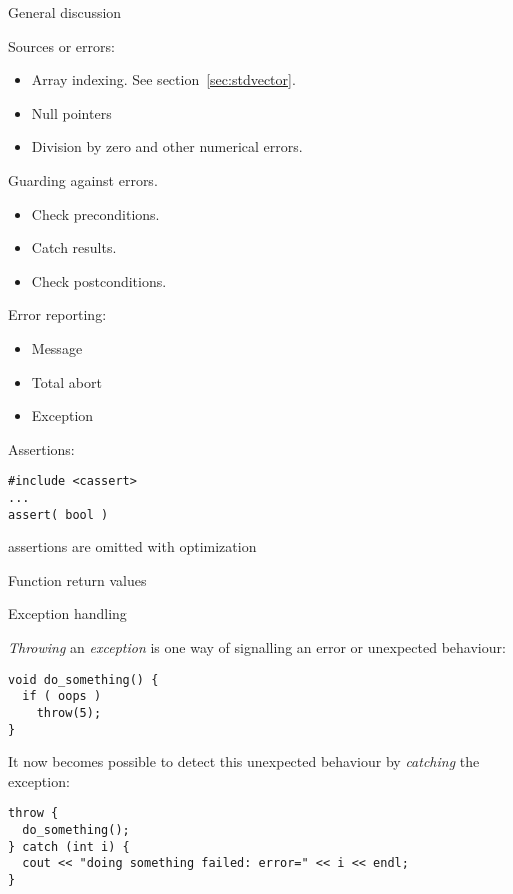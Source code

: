 
 {General discussion}

Sources or errors:
\begin{itemize}
\item Array indexing. See section~\ref{sec:stdvector}.
\item Null pointers
\item Division by zero and other numerical errors.
\end{itemize}

Guarding against errors.
\begin{itemize}
\item Check preconditions.
\item Catch results.
\item Check postconditions.
\end{itemize}

Error reporting:
\begin{itemize}
\item Message
\item Total abort
\item Exception
\end{itemize}

Assertions:
\begin{verbatim}
#include <cassert>
...
assert( bool )
\end{verbatim}
assertions are omitted with optimization

Function return values

 {Exception handling}

\emph{Throwing} an \emph{exception}%
 is one way of signalling an error or
unexpected behaviour:
\begin{verbatim}
void do_something() {
  if ( oops )
    throw(5);
}
\end{verbatim}

It now becomes possible to detect this unexpected behaviour by
\emph{catching}
the exception:
\begin{verbatim}
throw {
  do_something();
} catch (int i) {
  cout << "doing something failed: error=" << i << endl;
}
\end{verbatim}

